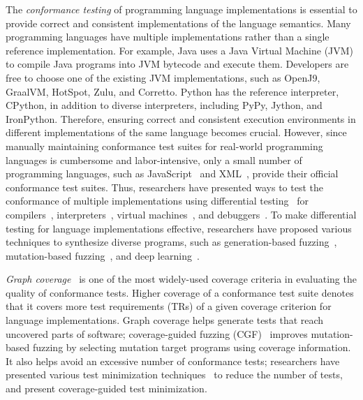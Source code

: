 \documentclass[acmsmall,review,screen]{acmart}
\begin{document}
The \textit{conformance testing} of programming language implementations is
essential to provide correct and consistent implementations of the
language semantics. Many programming languages have multiple implementations
rather than a single reference implementation. For example, Java uses a Java Virtual
Machine (JVM) to compile Java programs into JVM bytecode and execute them.
Developers are free to choose one of the existing JVM
implementations, such as OpenJ9, GraalVM, HotSpot, Zulu, and Corretto.
Python has the reference interpreter, CPython, in addition to diverse
interpreters, including PyPy, Jython, and IronPython.
Therefore, ensuring correct and consistent execution environments in different
implementations of the same language becomes crucial.
However, since manually maintaining conformance test suites for
real-world programming languages is cumbersome and labor-intensive, only a
small number of programming languages, such as JavaScript~\cite{test262}
and XML~\cite{xml-test-suite}, provide their official conformance test suites.
Thus, researchers have presented ways to test the
conformance of multiple implementations using differential
testing~\cite{diff-test} for compilers~\cite{csmith, deep-smith, diff-cpp-front,
diff-test-embedded}, interpreters~\cite{jit-picking, comfort}, virtual
machines~\cite{java-diff-test}, and debuggers~\cite{diff-debugger}.
To make differential testing for language implementations effective,
researchers have proposed various techniques to synthesize diverse programs,
such as generation-based fuzzing~\cite{csmith, jit-picking, diff-test-embedded, diff-debugger},
mutation-based fuzzing~\cite{java-diff-test, diff-cpp-front},
and deep learning~\cite{comfort, deep-smith}.


\textit{Graph coverage}~\cite{cov-def} is one of the most widely-used coverage criteria
in evaluating the quality of conformance tests.
Higher coverage of a conformance test suite denotes that it covers more
test requirements (TRs) of a given coverage criterion for language implementations.
Graph coverage helps generate tests that reach uncovered parts of software;
coverage-guided fuzzing (CGF)~\cite{afl} improves mutation-based fuzzing
by selecting mutation target programs using coverage information.
It also helps avoid an excessive number of conformance tests;
researchers have presented various test minimization techniques~\cite{test-minimize-survey}
to reduce the number of tests, and
\citet{cov-test-minimize} present coverage-guided test minimization.
\end{document}

